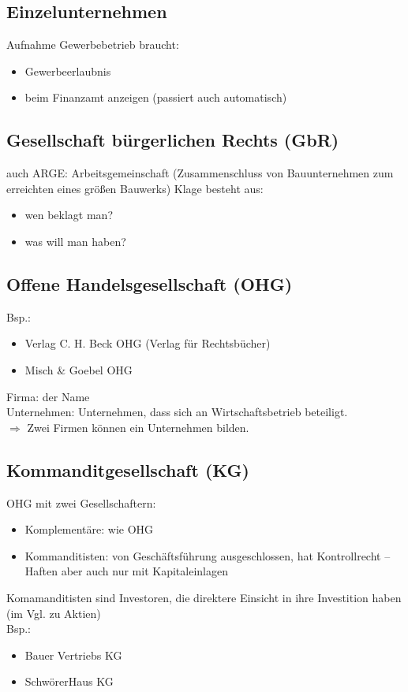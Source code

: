 \subsection{Einzelunternehmen}
Aufnahme Gewerbebetrieb braucht:
\begin{itemize}
\item Gewerbeerlaubnis
\item beim Finanzamt anzeigen (passiert auch automatisch)
\end{itemize}
\subsection{Gesellschaft bürgerlichen Rechts (GbR)}
auch ARGE: Arbeitsgemeinschaft (Zusammenschluss von Bauunternehmen zum erreichten eines größen Bauwerks)
Klage besteht aus:
\begin{itemize}
\item wen beklagt man?
\item was will man haben?
\end{itemize}
\subsection{Offene Handelsgesellschaft (OHG)}
Bsp.: 
\begin{itemize}
\item Verlag C. H. Beck OHG (Verlag für Rechtsbücher)
\item Misch \& Goebel OHG
\end{itemize}
Firma: der Name\\
Unternehmen: Unternehmen, dass sich an Wirtschaftsbetrieb beteiligt.\\
$ \Rightarrow $ Zwei Firmen können ein Unternehmen bilden.

\subsection{Kommanditgesellschaft (KG)}
OHG mit zwei Gesellschaftern:
\begin{itemize}
\item Komplementäre: wie OHG
\item Kommanditisten: von Geschäftsführung ausgeschlossen, hat Kontrollrecht -- Haften aber auch nur mit Kapitaleinlagen
\end{itemize}
Komamanditisten sind Investoren, die direktere Einsicht in ihre Investition haben (im Vgl. zu Aktien)\\
Bsp.:
\begin{itemize}
\item Bauer Vertriebs KG
\item SchwörerHaus KG
\end{itemize}

